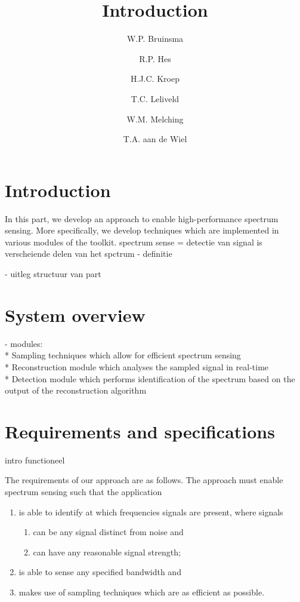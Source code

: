 \documentclass[a4paper, openany, oneside]{memoir}
\title{Introduction}
\author{W.P. Bruinsma \and R.P. Hes \and H.J.C. Kroep \and T.C. Leliveld \and W.M. Melching \and T.A. aan de Wiel}
\begin{document}
\section{Introduction}
In this part, we develop an approach to enable high-performance spectrum sensing. More specifically, we develop techniques which are implemented in various modules of the toolkit.
spectrum sense = detectie van signal is verscheiende delen van het spctrum
- definitie

- uitleg structuur van part


\section{System overview}
- modules: \\ 
* Sampling techniques which allow for efficient spectrum sensing \\
* Reconstruction module which analyses the sampled signal in real-time \\
* Detection module which performs identification of the spectrum based on the output of the reconstruction algorithm \\


\section{Requirements and specifications}
intro functioneel

The requirements of our approach are as follows. The approach must enable spectrum sensing such that the application
\begin{enumerate}
    \item is able to identify at which frequencies signals are present, where signals
    \begin{enumerate}
        \item can be any signal distinct from noise and
        \item can have any reasonable signal strength;
    \end{enumerate}
    \item is able to sense any specified bandwidth and
    \item makes use of sampling techniques which are as efficient as possible.
\end{enumerate}
\end{document}
